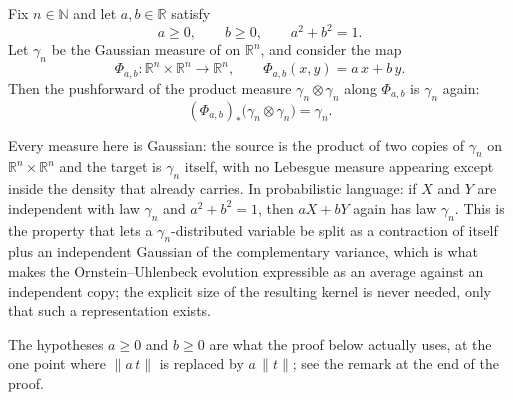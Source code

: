 \begin{lemma}
Fix $n \in \mathbb{N}$ and let $a, b \in \mathbb{R}$ satisfy
\[
  a \geq 0, \qquad b \geq 0, \qquad a^2 + b^2 = 1 .
\]
Let $\gamma_n$ be the Gaussian measure of  on
$\mathbb{R}^n$, and consider the map
\[
  \Phi_{a,b} : \mathbb{R}^n \times \mathbb{R}^n \to \mathbb{R}^n,
  \qquad \Phi_{a,b}(x,y) = a\,x + b\,y .
\]
Then the pushforward of the product measure $\gamma_n \otimes \gamma_n$ along
$\Phi_{a,b}$ is $\gamma_n$ again:
\[
  (\Phi_{a,b})_* \bigl( \gamma_n \otimes \gamma_n \bigr) = \gamma_n .
\]

Every measure here is Gaussian: the source is the product of two copies of
$\gamma_n$ on $\mathbb{R}^n \times \mathbb{R}^n$ and the target is $\gamma_n$
itself, with no Lebesgue measure appearing except inside the density that
 already carries.  In probabilistic language: if $X$ and $Y$
are independent with law $\gamma_n$ and $a^2 + b^2 = 1$, then $aX + bY$ again has
law $\gamma_n$.  This is the property that lets a $\gamma_n$-distributed variable
be split as a contraction of itself plus an independent Gaussian of the
complementary variance, which is what makes the Ornstein--Uhlenbeck evolution
expressible as an average against an independent copy; the explicit size of the
resulting kernel is never needed, only that such a representation exists.

The hypotheses $a \geq 0$ and $b \geq 0$ are what the proof below actually uses,
at the one point where $\|a\,t\|$ is replaced by $a\,\|t\|$; see the remark at the
end of the proof.
\end{lemma}
